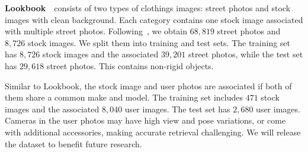 \documentclass[runningheads]{llncs}
\begin{document}
{\flushleft \textbf{Lookbook}~\cite{DBLP:conf/eccv/YooKPPK16}}~consists of two types of clothings images: street photos and stock images with clean background. 
Each category contains one stock image associated with multiple street photos.
Following~\cite{DBLP:conf/eccv/YooKPPK16}, we obtain $68,819$ street photos and $8,726$ stock images. 
We split them into training and test sets. The training set has $8,726$ stock images and the associated $39,201$ street photos, while the test set has $29,618$ street photos. This contains non-rigid objects.

Similar to Lookbook, the stock image and user photos are associated if both of them share a common make and model. 
The training set includes $471$ stock images and the associated $8,040$ user images. The test set has $2,680$ user images.
Cameras in the user photos may have high view and pose variations, or come with additional accessories, making accurate retrieval challenging. 
We will release the dataset to benefit future research.
\end{document}
